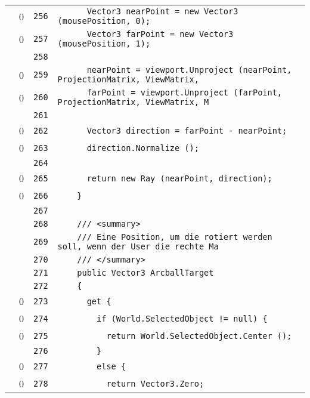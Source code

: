 \documentclass[a4paper,10pt]{article}
\begin{document}
\begin{longtable}[l]{lrrl}
\cellcolor{red} & 0 & \verb~256~ & \verb~      Vector3 nearPoint = new Vector3 (mousePosition, 0);~\\
\cellcolor{red} & 0 & \verb~257~ & \verb~      Vector3 farPoint = new Vector3 (mousePosition, 1);~\\
\cellcolor{gray} &  & \verb~258~ & \verb~~\\
\cellcolor{red} & 0 & \verb~259~ & \verb~      nearPoint = viewport.Unproject (nearPoint, ProjectionMatrix, ViewMatrix,~\\
\cellcolor{red} & 0 & \verb~260~ & \verb~      farPoint = viewport.Unproject (farPoint, ProjectionMatrix, ViewMatrix, M~\\
\cellcolor{gray} &  & \verb~261~ & \verb~~\\
\cellcolor{red} & 0 & \verb~262~ & \verb~      Vector3 direction = farPoint - nearPoint;~\\
\cellcolor{red} & 0 & \verb~263~ & \verb~      direction.Normalize ();~\\
\cellcolor{gray} &  & \verb~264~ & \verb~~\\
\cellcolor{red} & 0 & \verb~265~ & \verb~      return new Ray (nearPoint, direction);~\\
\cellcolor{red} & 0 & \verb~266~ & \verb~    }~\\
\cellcolor{gray} &  & \verb~267~ & \verb~~\\
\cellcolor{gray} &  & \verb~268~ & \verb~    /// <summary>~\\
\cellcolor{gray} &  & \verb~269~ & \verb~    /// Eine Position, um die rotiert werden soll, wenn der User die rechte Ma~\\
\cellcolor{gray} &  & \verb~270~ & \verb~    /// </summary>~\\
\cellcolor{gray} &  & \verb~271~ & \verb~    public Vector3 ArcballTarget~\\
\cellcolor{gray} &  & \verb~272~ & \verb~    {~\\
\cellcolor{red} & 0 & \verb~273~ & \verb~      get {~\\
\cellcolor{red} & 0 & \verb~274~ & \verb~        if (World.SelectedObject != null) {~\\
\cellcolor{red} & 0 & \verb~275~ & \verb~          return World.SelectedObject.Center ();~\\
\cellcolor{gray} &  & \verb~276~ & \verb~        }~\\
\cellcolor{red} & 0 & \verb~277~ & \verb~        else {~\\
\cellcolor{red} & 0 & \verb~278~ & \verb~          return Vector3.Zero;~\\

\end{longtable}
\end{document}
